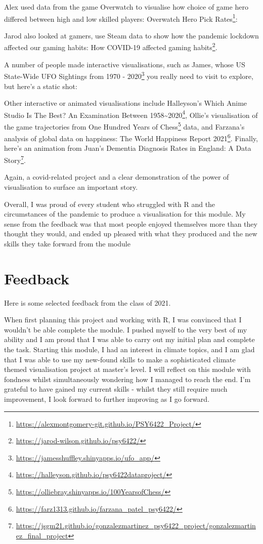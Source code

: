 \documentclass[
  12pt,
  a5paper,
]{book}
\DeclareRobustCommand{\href}[2]{#2\footnote{\url{#1}}}
\begin{document}
Alex used data from the game Overwatch to visualise how choice of game hero differed between high and low skilled players: \href{https://alexmontgomery-git.github.io/PSY6422_Project/}{Overwatch Hero Pick Rates}:

Jarod also looked at gamers, use Steam data to show how the pandemic lockdown affected our gaming habits: \href{https://jarod-wilson.github.io/psy6422/}{How COVID-19 affected gaming habits}.

A number of people made interactive visualisations, such as James, whose \href{https://jamesshuffley.shinyapps.io/ufo_app/}{US State-Wide UFO Sightings from 1970 - 2020} you really need to visit to explore, but here's a static shot:

Other interactive or animated visualisations include Halleyson's \href{https://halleyson.github.io/psy6422dataproject/}{Which Anime Studio Is The Best? An Examination Between 1958\textasciitilde2020}, Ollie's visualisation of the game trajectories from \href{https://olliebray.shinyapps.io/100YearsofChess/}{One Hundred Years of Chess} data, and Farzana's analysis of global data on happiness: \href{https://farz1313.github.io/farzana_patel_psy6422/}{The World Happiness Report 2021}. Finally, here's an animation from Juan's \href{https://jsgm21.github.io/gonzalezmartinez_psy6422_project/gonzalezmartinez_final_project}{Dementia Diagnosis Rates in England: A Data Story}.

Again, a covid-related project and a clear demonstration of the power of visualisation to surface an important story.

Overall, I was proud of every student who struggled with R and the circumstances of the pandemic to produce a visualisation for this module. My sense from the feedback was that most people enjoyed themselves more than they thought they would, and ended up pleased with what they produced and the new skills they take forward from the module

\hypertarget{feedback-1}{%
\section{Feedback}\label{feedback-1}}

Here is some selected feedback from the class of 2021.

When first planning this project and working with R, I was convinced that I wouldn't be able complete the module. I pushed myself to the very best of my ability and I am proud that I was able to carry out my initial plan and complete the task. Starting this module, I had an interest in climate topics, and I am glad that I was able to use my new-found skills to make a sophisticated climate themed visualisation project at master's level. I will reflect on this module with fondness whilst simultaneously wondering how I managed to reach the end. I'm grateful to have gained my current skills - whilst they still require much improvement, I look forward to further improving as I go forward.
\end{document}
